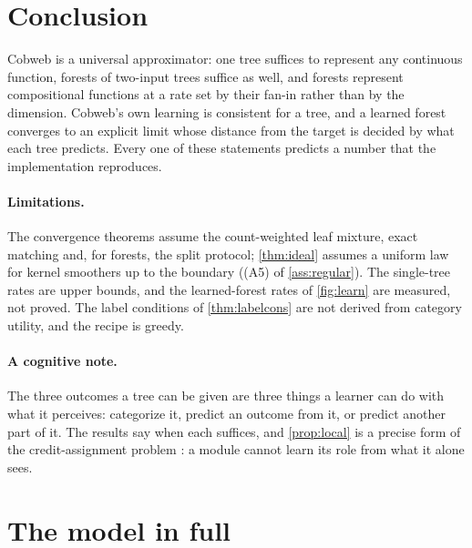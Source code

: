 \documentclass[11pt]{article}
\theoremstyle{definition}
\theoremstyle{remark}
\begin{document}
\section{Conclusion}\label{sec:conclusion}

Cobweb is a universal approximator: one tree suffices to represent any continuous
function, forests of two-input trees suffice as well, and forests represent compositional
functions at a rate set by their fan-in rather than by the dimension.  Cobweb's own
learning is consistent for a tree, and a learned forest converges to an explicit limit
whose distance from the target is decided by what each tree predicts.  Every one of these
statements predicts a number that the implementation reproduces.

\paragraph{Limitations.}
The convergence theorems assume the count-weighted leaf mixture, exact matching and, for
forests, the split protocol; \cref{thm:ideal} assumes a uniform law for kernel smoothers up
to the boundary ((A5) of \cref{ass:regular}).  The single-tree rates are upper bounds, and
the learned-forest rates of \cref{fig:learn} are measured, not proved.  The label conditions
of \cref{thm:labelcons} are not derived from category utility, and the recipe is greedy.

\paragraph{A cognitive note.}
The three outcomes a tree can be given are three things a learner can do with what it
perceives: categorize it, predict an outcome from it, or predict another part of it.  The
results say when each suffices, and \cref{prop:local} is a precise form of the
credit-assignment problem \citep{minsky1961}: a module cannot learn its role from what it
alone sees.

\appendix
{}


\section{The model in full}\label{app:model}\label{sec:model}
\end{document}
